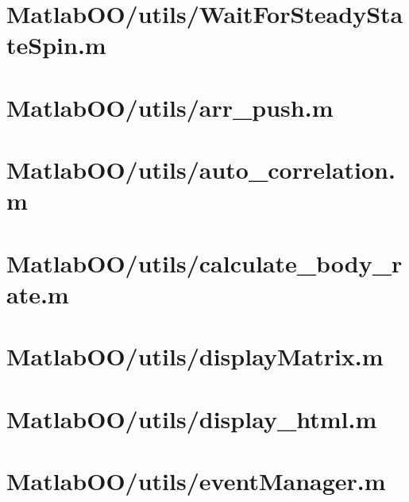 \pagebreak
\section{MatlabOO/utils/WaitForSteadyStateSpin.m}\label{code:MatlabOO/utils/WaitForSteadyStateSpin.m}


\pagebreak
\section{MatlabOO/utils/arr\_push.m}\label{code:MatlabOO/utils/arr_push.m}


\pagebreak
\section{MatlabOO/utils/auto\_correlation.m}\label{code:MatlabOO/utils/auto_correlation.m}


\pagebreak
\section{MatlabOO/utils/calculate\_body\_rate.m}\label{code:MatlabOO/utils/calculate_body_rate.m}


\pagebreak
\section{MatlabOO/utils/displayMatrix.m}\label{code:MatlabOO/utils/displayMatrix.m}


\pagebreak
\section{MatlabOO/utils/display\_html.m}\label{code:MatlabOO/utils/display_html.m}


\pagebreak
\section{MatlabOO/utils/eventManager.m}\label{code:MatlabOO/utils/eventManager.m}


